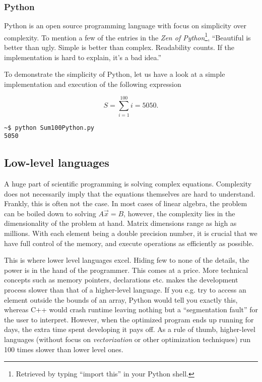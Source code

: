 \subsubsection{Python}
\label{sec:Python}

Python is an open source programming language with focus on simplicity over complexity. To mention a few of the entries in the \textit{Zen of Python}\footnote{Retrieved by typing ``import this'' in your Python shell.}, ``Beautiful is better than ugly. Simple is better than complex. Readability counts. If the implementation is hard to explain, it's a bad idea.''

To demonstrate the simplicity of Python, let us have a look at a simple implementation and execution of the following expression

\[
 S = \sum_{i=1}^{100} i = 5050.  \label{eq:sum100}
\]




\begin{verbatim}
~$ python Sum100Python.py 
5050
\end{verbatim}




\subsection{Low-level languages}
\label{sec:lowlevel}

A huge part of scientific programming is solving complex equations. Complexity does not necessarily imply that the equations themselves are hard to understand. Frankly, this is often not the case. In most cases of linear algebra, the problem can be boiled down to solving $A\vec x = B$, however, the complexity lies in the dimensionality of the problem at hand. Matrix dimensions range as high as millions. With each element being a double precision number, it is crucial that we have full control of the memory, and execute operations as efficiently as possible. 

This is where lower level languages excel. Hiding few to none of the details, the power is in the hand of the programmer. This comes at a price. More technical concepts such as memory pointers, declarations etc. makes the development process slower than that of a higher-level language. If you e.g. try to access an element outside the bounds of an array, Python would tell you exactly this, whereas C++ would crash runtime leaving nothing but a ``segmentation fault'' for the user to interpret. However, when the optimized program ends up running for days, the extra time spent developing it pays off. As a rule of thumb, higher-level languages (without focus on \textit{vectorization} or other optimization techniques) run 100 times slower than lower level ones. 

